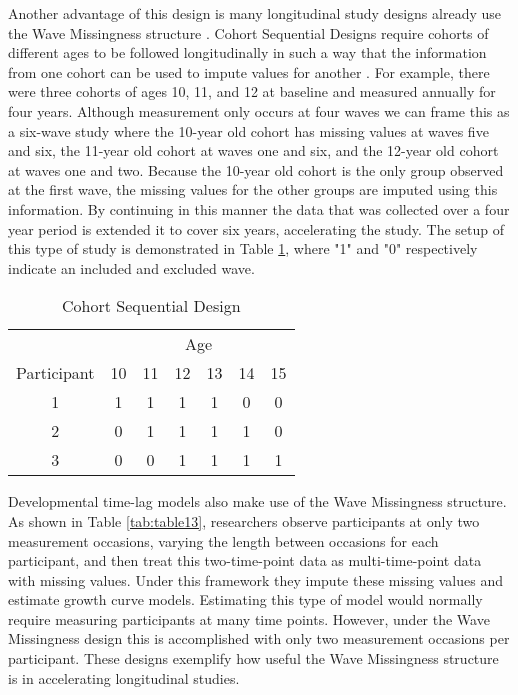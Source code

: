 \documentclass{svjour3}                     %
\begin{document}
Another advantage of this design is many longitudinal study designs already use the Wave Missingness structure \citep{little2013planned}. Cohort Sequential Designs require cohorts of different ages to be followed longitudinally in such a way that the information from one cohort can be used to impute values for another \citep{little2013longitudinal, duncan2013introduction}. For example, there were three cohorts of ages 10, 11, and 12 at baseline and measured annually for four years. Although measurement only occurs at four waves we can frame this as a six-wave study where the 10-year old cohort has missing values at waves five and six, the 11-year old cohort at waves one and six, and the 12-year old cohort at waves one and two. Because the 10-year old cohort is the only group observed at the first wave, the missing values for the other groups are imputed using this information. By continuing in this manner the data that was collected over a four year period is extended it to cover six years, accelerating the study. The setup of this type of study is demonstrated in Table \ref{tab:table12}, where "1" and "0" respectively indicate an included and excluded wave. \par

\begin{table}[t!]
	\centering
	\caption{Cohort Sequential Design}
	\label{tab:table12}
	\setlength{\tabcolsep}{0.5cm}
	\begin{tabular}{c|cccccc}
		\toprule
		& \multicolumn{6}{c}{Age} \\
		Participant & 10 & 11 & 12 & 13 & 14 & 15 \\
		\midrule
		1 & 1 & 1 & 1 & 1 & 0 & 0\\
		2 & 0 & 1 & 1 & 1 & 1 & 0\\
		3 & 0 & 0 & 1 & 1 & 1 & 1\\
		\bottomrule
	\end{tabular}
\end{table}

Developmental time-lag models \citep{mcardle1997expanding} also make use of the Wave Missingness structure. As shown in Table \ref{tab:table13}, researchers observe participants at only two measurement occasions, varying the length between occasions for each participant, and then treat this two-time-point data as multi-time-point data with missing values. Under this framework they impute these missing values and estimate growth curve models. Estimating this type of model would normally require measuring participants at many time points. However, under the Wave Missingness design this is accomplished with only two measurement occasions per participant. These designs exemplify how useful the Wave Missingness structure is in accelerating longitudinal studies. \par
\end{document}
